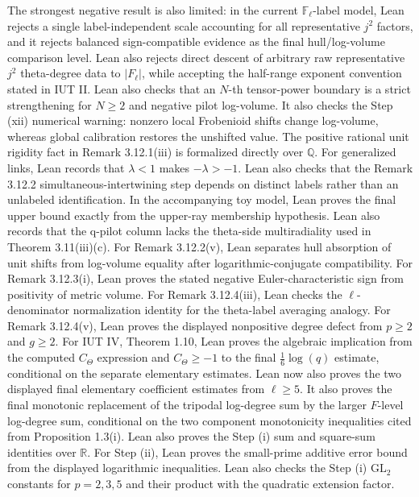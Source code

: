 \documentclass[11pt]{article}
\newcommand{\F}{\mathbb{F}}
\begin{document}
The strongest negative result is also limited: in the current \(\F_\ell\)-label
model, Lean rejects a single label-independent scale accounting for all
representative \(j^2\) factors, and it rejects balanced sign-compatible evidence
as the final hull/log-volume comparison level.  Lean also rejects direct descent
of arbitrary raw representative \(j^2\) theta-degree data to \(|F_\ell|\), while
accepting the half-range exponent convention stated in IUT II.
Lean also checks that an \(N\)-th tensor-power boundary is a strict strengthening
for \(N\ge2\) and negative pilot log-volume.  It also checks the Step (xii)
numerical warning: nonzero local Frobenioid shifts change log-volume, whereas
global calibration restores the unshifted value.  The positive rational unit
rigidity fact in Remark 3.12.1(iii) is formalized directly over \(\mathbb{Q}\).
For generalized links, Lean records that \(\lambda<1\) makes \(-\lambda>-1\).
Lean also checks that the Remark 3.12.2 simultaneous-intertwining step depends
on distinct labels rather than an unlabeled identification.
In the accompanying toy model, Lean proves the final upper bound exactly from
the upper-ray membership hypothesis.
Lean also records that the q-pilot column lacks the theta-side multiradiality
used in Theorem 3.11(iii)(c).
For Remark 3.12.2(v), Lean separates hull absorption of unit shifts from
log-volume equality after logarithmic-conjugate compatibility.
For Remark 3.12.3(i), Lean proves the stated negative Euler-characteristic sign
from positivity of metric volume.
For Remark 3.12.4(iii), Lean checks the \(\ell\)-denominator normalization
identity for the theta-label averaging analogy.
For Remark 3.12.4(v), Lean proves the displayed nonpositive degree defect from
\(p\ge2\) and \(g\ge2\).
For IUT IV, Theorem 1.10, Lean proves the algebraic implication from the
computed \(C_\Theta\) expression and \(C_\Theta\ge-1\) to the final
\(\frac16\log(q)\) estimate, conditional on the separate elementary estimates.
Lean now also proves the two displayed final elementary coefficient estimates
from \(\ell\ge5\).
It also proves the final monotonic replacement of the tripodal log-degree sum by
the larger \(F\)-level log-degree sum, conditional on the two component
monotonicity inequalities cited from Proposition 1.3(i).
Lean also proves the Step (i) sum and square-sum identities over \(\mathbb{R}\).
For Step (ii), Lean proves the small-prime additive error bound from the
displayed logarithmic inequalities.
Lean also checks the Step (i) \(\mathrm{GL}_2\) constants for \(p=2,3,5\) and
their product with the quadratic extension factor.
\end{document}
